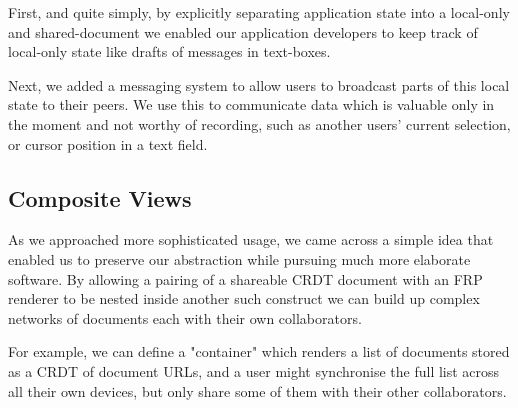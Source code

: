 \documentclass[sigplan,10pt]{acmart}
\begin{document}
\begin{itemize}
First, and quite simply, by explicitly separating application state into a local-only and shared-document we enabled our application developers to keep track of local-only state like drafts of messages in text-boxes.

Next, we added a messaging system to allow users to broadcast parts of this local state to their peers. We use this to communicate data which is valuable only in the moment and not worthy of recording, such as another users' current selection, or cursor position in a text field.

\subsection{Composite Views}
As we approached more sophisticated usage, we came across a simple idea that enabled us to preserve our abstraction while pursuing much more elaborate software. By allowing a pairing of a shareable CRDT document with an FRP renderer to be nested inside another such construct we can build up complex networks of documents each with their own collaborators.

For example, we can define a "container" which renders a list of documents stored as a CRDT of document URLs, and a user might synchronise the full list across all their own devices, but only share some of them with their other collaborators.

\begin{comment}
    \item how to rationalize all this?
    \begin{itemize}
	    \item FRP, for its easily reasoned-about loop: 
	    \begin{itemize}
			 \item transform a document functionally into an application view
			 \item create events in the application that trigger state updates
			 \item record \& broadcast state updates to peers
		\end{itemize}
	    \item many nested \& linked documents, each with their own render function
	    \begin{itemize}
		    \item a text note, a chat window, a user profile, a canvas
		\end{itemize}
	    \item store all local changes in append-only logs, distribute those logs to other interested peers
	    \item use cryptographic functions to produce self-validating data
	\end{itemize}
\end{comment}


\end{itemize}
\end{document}
